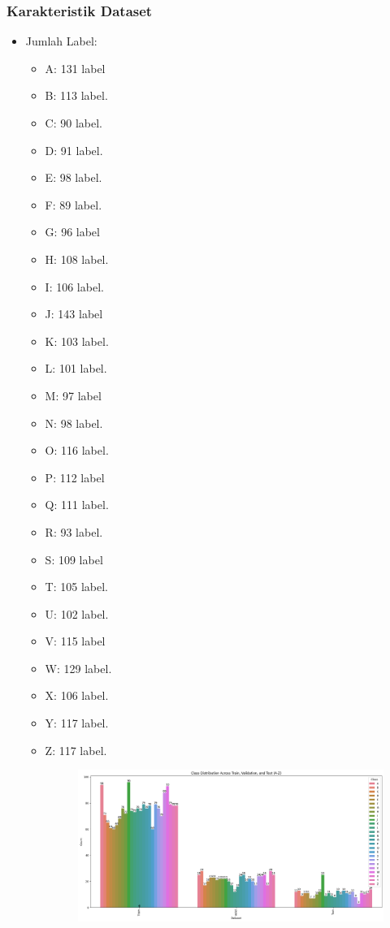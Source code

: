 \documentclass[12pt,a4paper]{article}
\begin{document}
\subsubsection{Karakteristik Dataset}
\begin{itemize}
    \item Jumlah Label:
    \begin{itemize}
        \item A: 131 label
        \item B: 113 label.
        \item C: 90 label.
        \item D: 91 label.
        \item E: 98 label.
        \item F: 89 label.
        \item G: 96 label
        \item H: 108 label.
        \item I: 106 label.
        \item J: 143 label
        \item K: 103 label.
        \item L: 101 label.
        \item M: 97 label
        \item N: 98 label.
        \item O: 116 label.
        \item P: 112 label
        \item Q: 111 label.
        \item R: 93 label.
        \item S: 109 label
        \item T: 105 label.
        \item U: 102 label.
        \item V: 115 label
        \item W: 129 label.
        \item X: 106 label.
        \item Y: 117 label.
        \item Z: 117 label.
        \begin{figure}[h]
            \centering
            \includegraphics[width=0.9\linewidth]{Images/Gambar4.png}

\end{figure}
\end{itemize}
\end{itemize}
\end{document}
